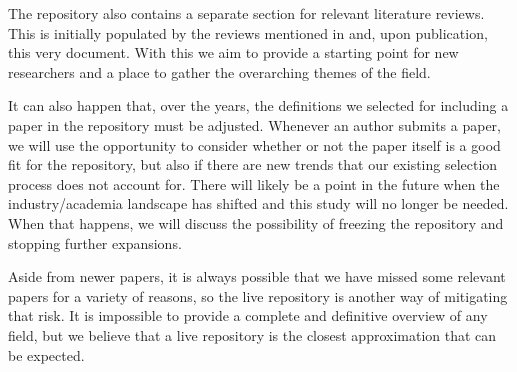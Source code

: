 The repository also contains a separate section for relevant literature reviews.
This is initially populated by the reviews mentioned in  and, upon publication, this very document.
With this we aim to provide a starting point for new researchers and a place to gather the overarching themes of the field.

It can also happen that, over the years, the definitions we selected for including a paper in the repository must be adjusted.
Whenever an author submits a paper, we will use the opportunity to consider whether or not the paper itself is a good fit for the repository, but also if there are new trends that our existing selection process does not account for.
There will likely be a point in the future when the industry/academia landscape has shifted and this study will no longer be needed.
When that happens, we will discuss the possibility of freezing the repository and stopping further expansions.

Aside from newer papers, it is always possible that we have missed some relevant papers for a variety of reasons, so the live repository is another way of mitigating that risk.
It is impossible to provide a complete and definitive overview of any field, but we believe that a live repository is the closest approximation that can be expected.



